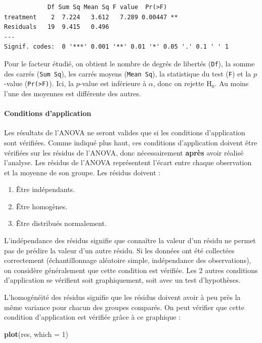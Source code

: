 \documentclass[a4paperpaper,]{article}
\newenvironment{Shaded}{\begin{snugshade}}{\end{snugshade}}
\newcommand{\DataTypeTok}[1]{\textcolor[rgb]{0.00,0.34,0.68}{#1}}
\newcommand{\DecValTok}[1]{\textcolor[rgb]{0.69,0.50,0.00}{#1}}
\newcommand{\KeywordTok}[1]{\textcolor[rgb]{0.12,0.11,0.11}{\textbf{#1}}}
\newcommand{\NormalTok}[1]{\textcolor[rgb]{0.12,0.11,0.11}{#1}}
\providecommand{\tightlist}{%
  \setlength{\itemsep}{0pt}\setlength{\parskip}{0pt}}
\let\oldparagraph\paragraph
\renewcommand{\paragraph}[1]{\oldparagraph{#1}\mbox{}}
\begin{document}
\begin{verbatim}
            Df Sum Sq Mean Sq F value  Pr(>F)   
treatment    2  7.224   3.612   7.289 0.00447 **
Residuals   19  9.415   0.496                   
---
Signif. codes:  0 '***' 0.001 '**' 0.01 '*' 0.05 '.' 0.1 ' ' 1
\end{verbatim}

Pour le facteur étudié, on obtient le nombre de degrés de libertés (\texttt{Df}), la somme des carrés (\texttt{Sum\ Sq}), les carrés moyens (\texttt{Mean\ Sq}), la statistique du test (\texttt{F}) et la \(p\)-value (\texttt{Pr(\textgreater{}F)}). Ici, la \(p\)-value est inférieure à \(\alpha\), donc on rejette H\(_0\). Au moins l'une des moyennes est différente des autres.

\hypertarget{CAANOVA}{%
\paragraph{Conditions d'application}\label{CAANOVA}}

Les résultats de l'ANOVA ne seront valides que si les conditions d'application sont vérifiées. Comme indiqué plus haut, ces conditions d'application doivent être vérifiées sur les résidus de l'ANOVA, donc nécessairement \textbf{après} avoir réalisé l'analyse. Les résidus de l'ANOVA représentent l'écart entre chaque observation et la moyenne de son groupe. Les résidus doivent :

\begin{enumerate}
\def\labelenumi{\arabic{enumi}.}
\tightlist
\item
  Être indépendants.
\item
  Être homogènes.
\item
  Être distribués normalement.
\end{enumerate}

L'indépendance des résidus signifie que connaître la valeur d'un résidu ne permet pas de prédire la valeur d'un autre résidu. Si les données ont été collectées correctement (échantillonnage aléatoire simple, indépendance des observations), on considère généralement que cette condition est vérifiée. Les 2 autres conditions d'application se vérifient soit graphiquement, soit avec un test d'hypothèses.

L'homogénéité des résidus signifie que les résidus doivent avoir à peu près la même variance pour chacun des groupes comparés. On peut vérifier que cette condition d'application est vérifiée grâce à ce graphique :

\begin{Shaded}
\begin{Highlighting}[]
\KeywordTok{plot}\NormalTok{(res, }\DataTypeTok{which =} \DecValTok{1}\NormalTok{)}
\end{Highlighting}
\end{Shaded}
\end{document}
